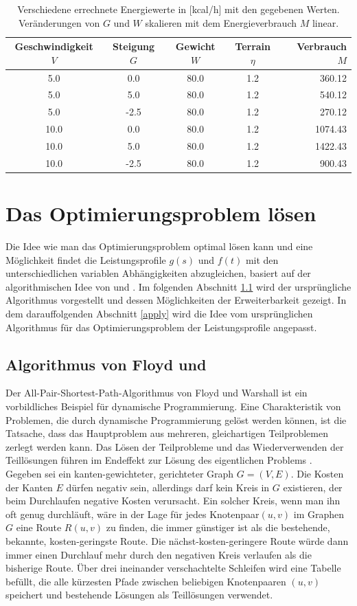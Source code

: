 \documentclass[12pt]{article}
\begin{document}
\begin{table}
\begin{tabular}{c|c|c|c||r}
	Geschwindigkeit $V$&Steigung $G$&Gewicht $W$&Terrain $\eta$&Verbrauch $M$\\ \hline \hline
	5.0&0.0&80.0&1.2&360.12\\
	5.0&5.0&80.0&1.2&540.12\\
	5.0&-2.5&80.0&1.2&270.12\\
	10.0&0.0&80.0&1.2&1074.43\\
	10.0&5.0&80.0&1.2&1422.43\\
	10.0&-2.5&80.0&1.2&900.43\\
\end{tabular}
\caption{Verschiedene errechnete Energiewerte in [kcal/h] mit den gegebenen Werten. Veränderungen von $G$ und $W$ skalieren mit dem Energieverbrauch $M$ linear.}
\label{tab:m_example}
\end{table}

\section{Das Optimierungsproblem lösen}\label{optimize}
Die Idee wie man das Optimierungsproblem optimal lösen kann und eine Möglichkeit findet die Leistungsprofile $g(s)$ und $f(t)$ mit den unterschiedlichen variablen Abhängigkeiten abzugleichen, basiert auf der algorithmischen Idee von \cite{floyd1962} und \cite{warshall1962}. Im folgenden Abschnitt \ref{Floyd} wird der ursprüngliche Algorithmus vorgestellt und dessen Möglichkeiten der Erweiterbarkeit gezeigt. In dem darauffolgenden Abschnitt \ref{apply} wird die Idee vom ursprünglichen Algorithmus für das Optimierungsproblem der Leistungsprofile angepasst.
\subsection{Algorithmus von Floyd und \cite{warshall1962}}\label{Floyd}
Der All-Pair-Shortest-Path-Algorithmus von Floyd und Warshall ist ein vorbildliches Beispiel für dynamische Programmierung. Eine Charakteristik von Problemen, die durch dynamische Programmierung gelöst werden können, ist die Tatsache, dass das Hauptproblem aus mehreren, gleichartigen Teilproblemen zerlegt werden kann. Das Lösen der Teilprobleme und das Wiederverwenden der Teillösungen führen im Endeffekt zur Lösung des eigentlichen Problems \citep{bellman1957}.\\
Gegeben sei ein kanten-gewichteter, gerichteter Graph $G = (V,E)$. Die Kosten der Kanten $E$  dürfen negativ sein, allerdings darf kein Kreis in $G$ existieren, der beim Durchlaufen negative Kosten verursacht. Ein solcher Kreis, wenn man ihn oft genug durchläuft, wäre in der Lage für jedes Knotenpaar$(u,v)$ im Graphen $G$ eine Route $R(u,v)$ zu finden, die immer günstiger ist als die bestehende, bekannte, kosten-geringste Route. Die nächst-kosten-geringere Route würde dann immer einen Durchlauf mehr durch den negativen Kreis verlaufen als die bisherige Route. Über drei ineinander verschachtelte Schleifen wird eine Tabelle befüllt, die alle kürzesten Pfade zwischen beliebigen Knotenpaaren $(u,v)$ speichert und bestehende Lösungen als Teillösungen verwendet.
\end{document}
